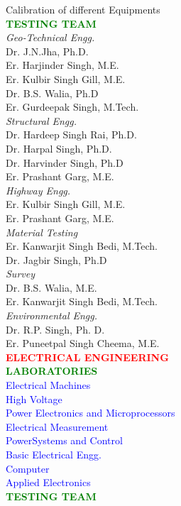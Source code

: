 \large Calibration of different Equipments\\
\textcolor{green}{\bf\large TESTING TEAM}\\
\emph{Geo-Technical Engg. }\\
Dr. J.N.Jha, Ph.D. \\
Er. Harjinder Singh, M.E. \\
Er. Kulbir Singh Gill, M.E. \\
Dr. B.S. Walia, Ph.D \\
Er. Gurdeepak Singh, M.Tech. \\
\emph{Structural Engg.}\\
Dr. Hardeep Singh Rai, Ph.D.\\
Dr. Harpal Singh, Ph.D.\\
Dr. Harvinder Singh, Ph.D\\
Er. Prashant Garg, M.E.\\
\emph{Highway Engg.}\\
Er. Kulbir Singh Gill, M.E.\\
Er. Prashant Garg, M.E.\\
\emph{Material Testing}\\
Er. Kanwarjit Singh Bedi, M.Tech. \\
Dr. Jagbir Singh, Ph.D \\
\emph{Survey}\\
Dr. B.S. Walia, M.E.\\
Er. Kanwarjit Singh Bedi, M.Tech. \\
\emph{Environmental Engg.}\\
Dr. R.P. Singh, Ph. D. \\
Er. Puneetpal Singh Cheema, M.E.\\
\textcolor{red}{\bf{\Large ELECTRICAL ENGINEERING}}\\
\textcolor{green}{\bf \large LABORATORIES}\\
\textcolor{blue}{Electrical Machines }\\
\textcolor{blue}{High Voltage}\\
\textcolor{blue}{Power Electronics and Microprocessors }\\
\textcolor{blue}{Electrical Measurement }\\
\textcolor{blue}{PowerSystems and Control}\\
\textcolor{blue}{Basic Electrical Engg.}\\
\textcolor{blue}{Computer}\\
\textcolor{blue}{Applied Electronics}\\
\textcolor{green}{\bf\large TESTING TEAM}\\
